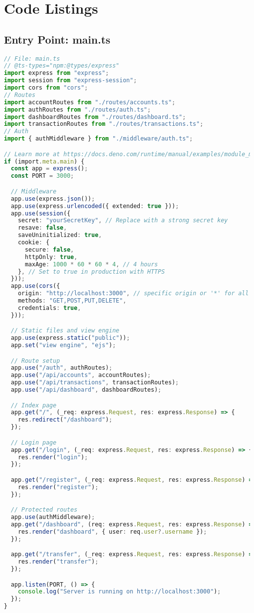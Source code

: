 \chapter{Code Listings}

\section{Entry Point: main.ts}
\begin{lstlisting}[language=TypeScript]
// File: main.ts
// @ts-types="npm:@types/express"
import express from "express";
import session from "express-session";
import cors from "cors";
// Routes
import accountRoutes from "./routes/accounts.ts";
import authRoutes from "./routes/auth.ts";
import dashboardRoutes from "./routes/dashboard.ts";
import transactionRoutes from "./routes/transactions.ts";
// Auth
import { authMiddleware } from "./middleware/auth.ts";

// Learn more at https://docs.deno.com/runtime/manual/examples/module_metadata#concepts
if (import.meta.main) {
  const app = express();
  const PORT = 3000;

  // Middleware
  app.use(express.json());
  app.use(express.urlencoded({ extended: true }));
  app.use(session({
    secret: "yourSecretKey", // Replace with a strong secret key
    resave: false,
    saveUninitialized: true,
    cookie: {
      secure: false,
      httpOnly: true,
      maxAge: 1000 * 60 * 60 * 4, // 4 hours
    }, // Set to true in production with HTTPS
  }));
  app.use(cors({
    origin: "http://localhost:3000", // specific origin or '*' for all
    methods: "GET,POST,PUT,DELETE",
    credentials: true,
  }));

  // Static files and view engine
  app.use(express.static("public"));
  app.set("view engine", "ejs");

  // Route setup
  app.use("/auth", authRoutes);
  app.use("/api/accounts", accountRoutes);
  app.use("/api/transactions", transactionRoutes);
  app.use("/api/dashboard", dashboardRoutes);

  // Index page
  app.get("/", (_req: express.Request, res: express.Response) => {
    res.redirect("/dashboard");
  });

  // Login page
  app.get("/login", (_req: express.Request, res: express.Response) => {
    res.render("login");
  });

  app.get("/register", (_req: express.Request, res: express.Response) => {
    res.render("register");
  });

  // Protected routes
  app.use(authMiddleware);
  app.get("/dashboard", (req: express.Request, res: express.Response) => {
    res.render("dashboard", { user: req.user?.username });
  });

  app.get("/transfer", (_req: express.Request, res: express.Response) => {
    res.render("transfer");
  });

  app.listen(PORT, () => {
    console.log("Server is running on http://localhost:3000");
  });
}
\end{lstlisting}

